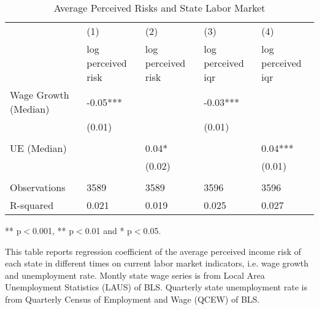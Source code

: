 	
	\begin{table}[ht]
		\centering
		\begin{adjustbox}{width=0.9\textwidth}
			\begin{threeparttable}
			\caption{Average Perceived Risks and State Labor Market}
			\label{macro_corr_he_state}
			\begin{tabular}{lllll}
					\hline 
				& (1)                & (2)                & (3)               & (4)               \\
				& log perceived risk & log perceived risk & log perceived iqr & log perceived iqr \\
				\hline 
				Wage Growth (Median) & -0.05***           &                    & -0.03***          &                   \\
				& (0.01)             &                    & (0.01)            &                   \\
				&                    &                    &                   &                   \\
				UE (Median)          &                    & 0.04*              &                   & 0.04***           \\
				&                    & (0.02)             &                   & (0.01)            \\
				&                    &                    &                   &                   \\
					\hline 
				Observations         & 3589               & 3589               & 3596              & 3596              \\
				R-squared            & 0.021              & 0.019              & 0.025             & 0.027             \\
				\hline      
			\end{tabular}
			
				\begin{tablenotes}
					\item *** p$<$0.001, ** p$<$0.01 and * p$<$0.05.
					\item This table reports regression coefficient of the average perceived income risk of each state in different times on current labor market indicators, i.e. wage growth and unemployment rate. Montly state wage series is from Local Area Unemployment Statistics (LAUS) of BLS. Quarterly state unemployment rate is from Quarterly Census of Employment and Wage (QCEW) of BLS. 
				\end{tablenotes}
			\end{threeparttable}
		\end{adjustbox}
	\end{table}


